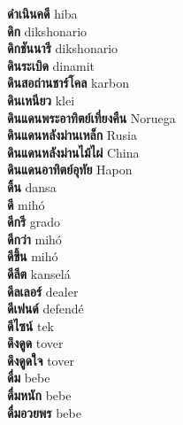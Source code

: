\textbf{ ดำเนินคดี  } hiba \\
\textbf{ ดิก  } dikshonario \\
\textbf{ ดิกชันนารี  } dikshonario \\
\textbf{ ดินระเบิด  } dinamit \\
\textbf{ ดินสอถ่านชาร์โคล  } karbon \\
\textbf{ ดินเหนียว  } klei \\
\textbf{ ดินแดนพระอาทิตย์เที่ยงคืน  } Noruega \\
\textbf{ ดินแดนหลังม่านเหล็ก  } Rusia \\
\textbf{ ดินแดนหลังม่านไม้ไผ่  } China \\
\textbf{ ดินแดนอาทิตย์อุทัย  } Hapon \\
\textbf{ ดิ้น  } dansa \\
\textbf{ ดี  } mihó \\
\textbf{ ดีกรี  } grado \\
\textbf{ ดีกว่า  } mihó \\
\textbf{ ดีขึ้น  } mihó \\
\textbf{ ดีลีต  } kanselá \\
\textbf{ ดีลเลอร์  } dealer \\
\textbf{ ดีเฟนด์  } defendé \\
\textbf{ ดีไซน์  } tek \\
\textbf{ ดึงดูด  } tover \\
\textbf{ ดึงดูดใจ  } tover \\
\textbf{ ดื่ม  } bebe \\
\textbf{ ดื่มหนัก  } bebe \\
\textbf{ ดื่มอวยพร  } bebe \\
